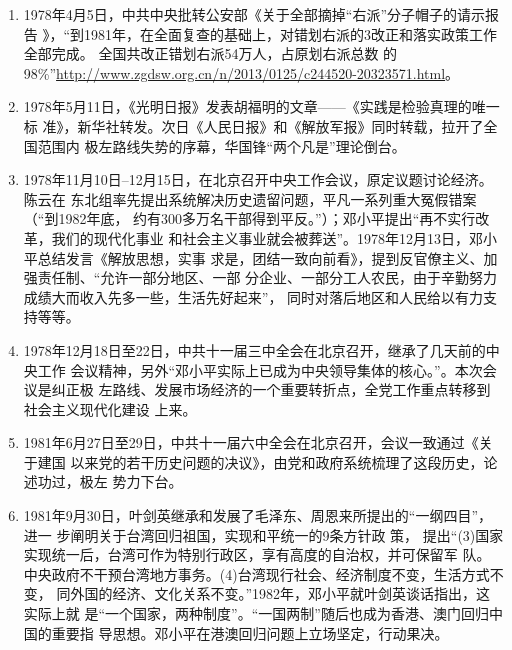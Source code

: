 \begin{enumerate}
\item 1978年4月5日，中共中央批转公安部《关于全部摘掉“右派”分子帽子的请示报告
  》，“到1981年，在全面复查的基础上，对错划右派的3改正和落实政策工作全部完成。
  全国共改正错划右派54万人，占原划右派总数
  的98\%”\url{http://www.zgdsw.org.cn/n/2013/0125/c244520-20323571.html}。

\item 1978年5月11日，《光明日报》发表胡福明的文章——《实践是检验真理的唯一标
  准》，新华社转发。次日《人民日报》和《解放军报》同时转载，拉开了全国范围内
  极左路线失势的序幕，华国锋“两个凡是”理论倒台。


\item 1978年11月10日--12月15日，在北京召开中央工作会议，原定议题讨论经济。陈云在
  东北组率先提出系统解决历史遗留问题，平凡一系列重大冤假错案（“到1982年底，
  约有300多万名干部得到平反。”）；邓小平提出“再不实行改革，我们的现代化事业
  和社会主义事业就会被葬送”。1978年12月13日，邓小平总结发言《解放思想，实事
  求是，团结一致向前看》，提到反官僚主义、加强责任制、“允许一部分地区、一部
  分企业、一部分工人农民，由于辛勤努力成绩大而收入先多一些，生活先好起来”，
  同时对落后地区和人民给以有力支持等等。

\item 1978年12月18日至22日，中共十一届三中全会在北京召开，继承了几天前的中央工作
  会议精神，另外“邓小平实际上已成为中央领导集体的核心。”。本次会议是纠正极
  左路线、发展市场经济的一个重要转折点，全党工作重点转移到社会主义现代化建设
  上来。

\item 1981年6月27日至29日，中共十一届六中全会在北京召开，会议一致通过《关于建国
  以来党的若干历史问题的决议》，由党和政府系统梳理了这段历史，论述功过，极左
  势力下台。

\item 1981年9月30日，叶剑英继承和发展了毛泽东、周恩来所提出的“一纲四目”，进一
  步阐明关于台湾回归祖国，实现和平统一的9条方针政
  策， 提出“(3)国家实现统一后，台湾可作为特别行政区，享有高度的自治权，并可保留军
  队。中央政府不干预台湾地方事务。(4)台湾现行社会、经济制度不变，生活方式不变，
  同外国的经济、文化关系不变。”1982年，邓小平就叶剑英谈话指出，这实际上就
  是“一个国家，两种制度”。“一国两制”随后也成为香港、澳门回归中国的重要指
  导思想。邓小平在港澳回归问题上立场坚定，行动果决。


\end{enumerate}
